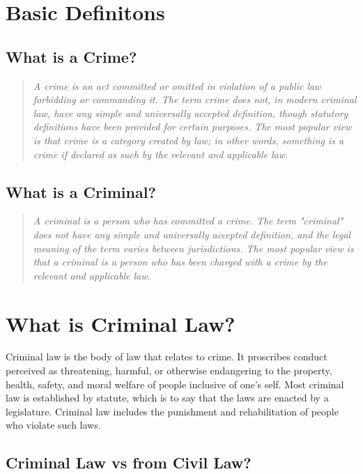 \documentclass[11pt]{article}
\begin{document}
\tableofcontents
\thispagestyle{empty}
\clearpage

\setcounter{page}{1}

\section{Basic Definitons}

\subsection{What is a Crime?}

\begin{quote}
	\textit{A crime is an act committed or omitted in violation of a public law forbidding or commanding it. The term crime does not, in modern criminal law, have any simple and universally accepted definition, though statutory definitions have been provided for certain purposes. The most popular view is that crime is a category created by law; in other words, something is a crime if declared as such by the relevant and applicable law.}
\end{quote}

\subsection{What is a Criminal?}

\begin{quote}
	\textit{A criminal is a person who has committed a crime. The term "criminal" does not have any simple and universally accepted definition, and the legal meaning of the term varies between jurisdictions. The most popular view is that a criminal is a person who has been charged with a crime by the relevant and applicable law.}
\end{quote}

\section{What is Criminal Law?}

Criminal law is the body of law that relates to crime. It proscribes conduct perceived as threatening, harmful, or otherwise endangering to the property, health, safety, and moral welfare of people inclusive of one's self. Most criminal law is established by statute, which is to say that the laws are enacted by a legislature. Criminal law includes the punishment and rehabilitation of people who violate such laws.

\subsection{Criminal Law vs from Civil Law?}
\end{document}

